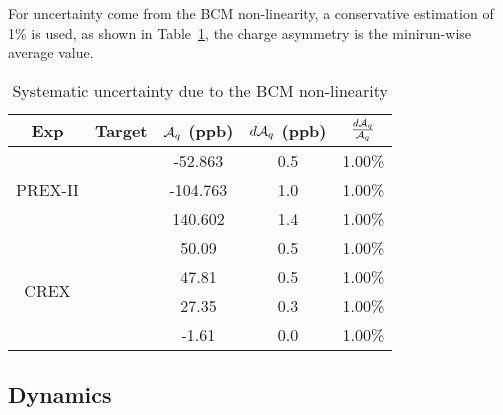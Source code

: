 For uncertainty come from the BCM non-linearity, a conservative estimation of 1\% is used,
as shown in Table~\ref{tab:AT_bcm_non-linearity}, the charge asymmetry is the 
minirun-wise average value.
\begin{table}[!h]
    \centering
    \begin{tabular}{c c | c c c}
	\hline
	Exp & Target	& $\mathcal{A}_{q}$ (ppb) & $d\mathcal{A}_{q}$ (ppb)    & $\frac{d\mathcal{A}_{q}}{\mathcal{A}_{q}}$   \\
	\hline
	\multirow{3}{*}{PREX-II}
	    & \C    & -52.863   & 0.5   & 1.00\%    \\ 
	    & \ca   & -104.763  & 1.0   & 1.00\%    \\ 
	    & \Pb   & 140.602   & 1.4   & 1.00\%    \\ 
	\hline
	\multirow{4}{*}{CREX}
	    & \C    & 50.09	& 0.5   & 1.00\%    \\ 
	    & \ca   & 47.81	& 0.5   & 1.00\%    \\ 
	    & \Ca   & 27.35	& 0.3   & 1.00\%    \\ 
	    & \Pb   & -1.61	& 0.0   & 1.00\%    \\ 
	\hline
    \end{tabular}
    \caption{Systematic uncertainty due to the BCM non-linearity}
    \label{tab:AT_bcm_non-linearity}
\end{table}

\subsection{Dynamics}

